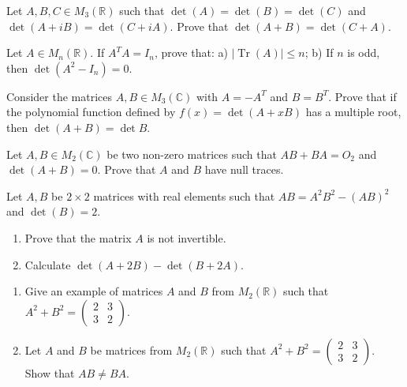 \documentclass[12pt]{article}
\begin{document}
\begin{problem}
Let $A,B,C\in M_3(\mathbb{R})$ such that $\det(A)=\det(B)=\det(C)$ and $\det(A+iB)=\det(C+iA)$. Prove that $\det(A+B)=\det(C+A)$.
\end{problem}

\begin{problem}
Let $A\in M_n(\mathbb{R})$. If $A^TA=I_n$, prove that: a) $|\operatorname{Tr}(A)|\le n$; b) If $n$ is odd, then $\det(A^2-I_n)=0$.
\end{problem}

\begin{problem}
Consider the matrices $A,B\in M_3(\mathbb{C})$ with $A=-A^T$ and $B=B^T$. Prove that if the polynomial function defined by $f(x)=\det(A+xB)$ has a multiple root, then $\det(A+B)=\det B$.
\end{problem}

\begin{problem}
Let $A,B\in M_2(\mathbb{C})$ be two non-zero matrices such that $AB+BA=O_2$ and $\det(A+B)=0$. Prove that $A$ and $B$ have null traces.
\end{problem}

\begin{problem}
Let $A,B$ be $2\times 2$ matrices with real elements such that $AB=A^2B^2-(AB)^2$ and $\det(B)=2$.
\begin{enumerate}[label=(\alph*)]
\item Prove that the matrix $A$ is not invertible.
\item Calculate $\det(A+2B) - \det(B+2A)$.
\end{enumerate}
\end{problem}

\begin{problem}
\begin{enumerate}[label=(\alph*)]
\item Give an example of matrices $A$ and $B$ from $M_2(\mathbb{R})$ such that $A^2+B^2 = \begin{pmatrix}2 & 3\\ 3 & 2\end{pmatrix}$.
\item Let $A$ and $B$ be matrices from $M_2(\mathbb{R})$ such that $A^2+B^2=\begin{pmatrix}2 & 3\\ 3 & 2\end{pmatrix}$. Show that $AB\ne BA$.
\end{enumerate}
\end{problem}
\end{document}
